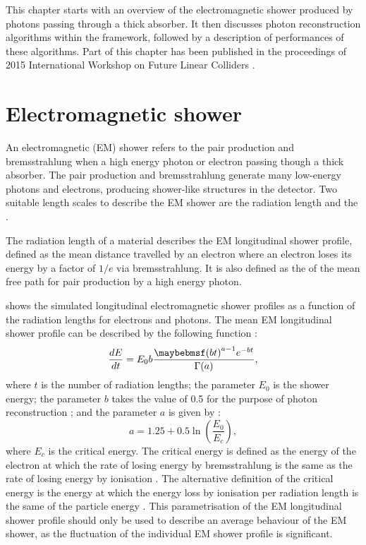 This chapter starts with an overview of the electromagnetic shower produced by photons passing through a thick absorber. It then discusses photon reconstruction algorithms within the \pandora framework, followed by a description of performances of these algorithms.  Part of this chapter has been published in the proceedings of 2015 International Workshop on Future Linear Colliders \cite{Xu:2016rcz}.




\section{Electromagnetic shower}
\label{sec:photonEMshower}
An electromagnetic (EM) shower refers to the pair production and bremsstrahlung when a high energy photon or electron passing though a thick absorber. The pair production and bremsstrahlung generate many low-energy photons and electrons, producing shower-like  structures in the detector. Two suitable length scales to describe the EM shower are the radiation length and the \RM \cite{PhysRev.149.201,Bathow:1970dn}.

The radiation length of a material describes the EM longitudinal  shower profile, defined as the mean distance travelled by an electron where an electron loses its energy by a factor of $1/e$ via bremsstrahlung. It is also defined as the  of the mean free path  for pair production by a high energy photon\cite{segre1977nuclei}.


 shows the simulated longitudinal electromagnetic shower profiles as a function of the radiation lengths for electrons and photons. The mean EM longitudinal shower profile can be described by the following function \cite{Longo:1975wb} :
\begin{equation}
\frac{dE}{dt} = E_0 b \frac{\parenths{bt}^{a-1}e^{-bt}}{\Gamma(a)},
\label{eq:photonEMshower}
\end{equation}
where $t$ is the number of radiation lengths; the parameter $E_0$ is the shower energy; the parameter $b$ takes the value of 0.5 for the purpose of photon reconstruction \cite{Agashe:2014kda}; and the parameter $a$ is given by \cite{Thomson:2009rp}:
\begin{equation}
a = 1.25 + 0.5\ln\left(\frac{E_0}{E_c}\right),
\end{equation}
where $E_c$ is the critical energy. The critical energy is defined as the energy of the electron at which the rate of losing energy by bremsstrahlung is the same as the rate of losing energy by ionisation \cite{1964NASSP3012.....B}. The alternative definition of the critical energy is the energy at which the energy loss by ionisation per radiation length is the same of the particle energy \cite{rossi1952high}. This parametrisation of the EM longitudinal shower profile should only be used to describe an average behaviour of the EM shower, as the fluctuation of the individual EM shower profile is significant.

